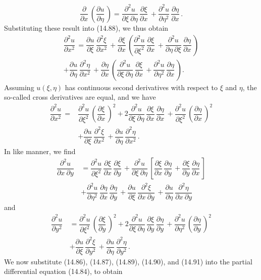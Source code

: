 \documentclass[11pt,a4paper, twoside]{report}
\newcommand{\pf}[2]{\dfrac{\partial #1}{\partial #2}\,}
\newcommand{\pfn}[3]{\dfrac{\partial^#3 #1}{\partial #2^#3}\,}
\newcommand{\pfp}[4]{\dfrac{\partial^#4 #1}{\partial #2\ \partial #3}\,}
\begin{document}
	$$
	\pf{}{x}\left(\pf{u}{\eta}\right) = \pfp{u}{\xi}{\eta}{2}\pf{\xi}{x} + \pfn{u}{\eta}{2}\pf{\eta}{x}.
	$$
	Substituting these result into (14.88), we thus obtain
	\begin{equation*}
		\begin{split}
			\pfn{u}{x}{2} = \pf{u}{\xi}\pfn{\xi}{x}{2} + \pf{\xi}{x}\left(\pfn{u}{\xi}{2}\pf{\xi}{x} + \pfp{u}{\eta}{\xi}{2}\pf{\eta}{x}\right)\\
			+ \pf{u}{\eta}\pfn{\eta}{x}{2} + \pf{\eta}{x}\left(\pfp{u}{\xi}{\eta}{2}\pf{\xi}{x} + \pfn{u}{\eta}{2}\pf{\eta}{x}\right).
		\end{split}
	\end{equation*}
	Assuming $u(\xi, \eta)$ has continuous second derivatives with respect to $\xi$ and $\eta$, the so-called cross derivatives are equal, and we have
	\begin{equation}\tag{14.89}
		\begin{split}
			\pfn{u}{x}{2} = &\pfn{u}{\xi}{2}\left(\pf{\xi}{x}\right)^2 + 2\pfp{u}{\xi}{\eta}{2}\pf{\xi}{x}\pf{\eta}{x} + \pfn{u}{\xi}{2}\left(\pf{\eta}{x}\right)^2\\
			&+ \pf{u}{\xi}\pfn{\xi}{x}{2} + \pf{u}{\eta}\pfn{\eta}{x}{2}.
		\end{split}
	\end{equation}
	In like manner, we find
	\begin{equation}\tag{14.90}
		\begin{split}
			\pfp{u}{x}{y}{2} &= \pfn{u}{\xi}{2}\pf{\xi}{x}\pf{\xi}{y} + \pfp{u}{\xi}{\eta}{2}\left[\pf{\xi}{x}\pf{\eta}{y} + \pf{\xi}{y}\pf{\eta}{x}\right]\\
			& +\pfn{u}{\eta}{2}\pf{\eta}{x}\pf{\eta}{y} + \pf{u}{\xi}\pfp{\xi}{x}{y}{2} + \pf{u}{\eta}\pfp{\eta}{x}{y}{2}
		\end{split}
	\end{equation}
	and
	\begin{equation}\tag{14.91}
		\begin{split}
			\pfn{u}{y}{2} &= \pfn{u}{\xi}{2}\left(\pf{\xi}{y}\right)^2 + 2\pfp{u}{\xi}{\eta}{2}\pf{\xi}{y}\pf{\eta}{y} + \pfn{u}{\eta}{2}\left(\pf{\eta}{y}\right)^2\\
			& + \pf{u}{\xi}\pfn{\xi}{y}{2} + \pf{u}{\eta}\pfn{\eta}{y}{2}.
		\end{split}
	\end{equation}
	We now substitute (14.86), (14.87), (14.89), (14.90), and (14.91) into the partial differential equation (14.84), to obtain
\end{document}
